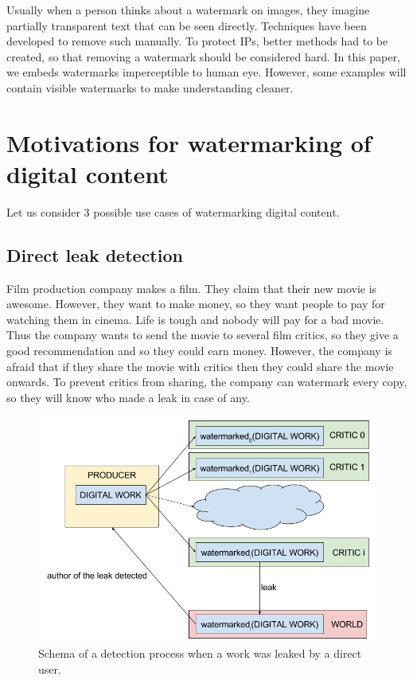 \documentclass[a4paper,12pt]{article}
\begin{document}
Usually when a person thinks about a watermark on images, they imagine partially transparent
text that can be seen directly. Techniques have been
developed to remove such manually. To protect IPs, better methods had to be
created, so that removing a watermark should be considered hard. In this paper,
we embeds watermarks imperceptible to human eye. However, some examples
will contain visible watermarks to make understanding cleaner.

\section{Motivations for watermarking of digital content}

Let us consider 3 possible use cases of watermarking digital content.

\subsection*{Direct leak detection}

Film production company makes a film. They claim that their new movie is
awesome. However, they want to make money, so they want people to pay for
watching them in cinema. Life is tough and nobody will pay for a bad movie. Thus
the company wants to send the movie to several film critics, so they give a good
recommendation and so they could earn money. However, the company is afraid that
if they share the movie with critics then they could share the movie
onwards. To prevent critics from sharing, the company can watermark every copy, so
they will know who made a leak in case of any.
\begin{figure}[ht!]
  \centering
    \includegraphics[width=1.0\textwidth]{../../images/simple-leak-detection.png}
  \caption{Schema of a detection process when a work was leaked by a direct user.}
  \label{fig:direct-schema}
\end{figure}
\end{document}
